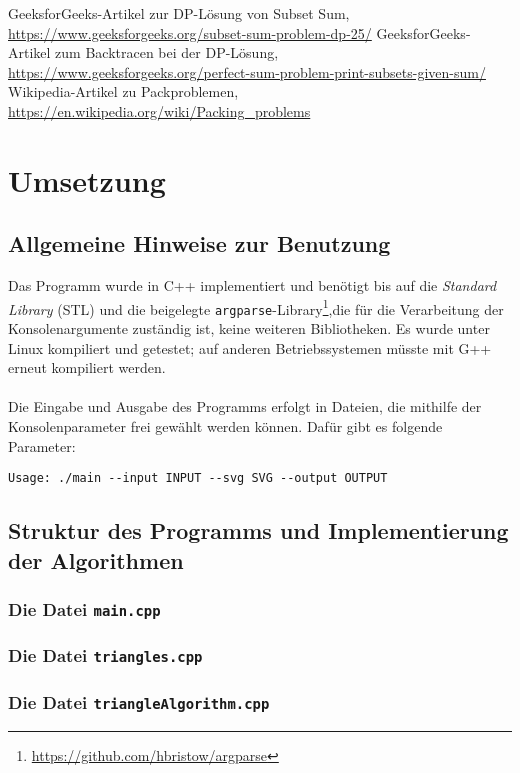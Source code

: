 \documentclass[a4paper, notitlepage, 12pt]{scrartcl}
\begin{document}
\begin{thebibliography}{xx}
	 GeeksforGeeks-Artikel zur DP-Lösung von Subset Sum, \url{https://www.geeksforgeeks.org/subset-sum-problem-dp-25/}
	 GeeksforGeeks-Artikel zum Backtracen bei der DP-Lösung, \url{https://www.geeksforgeeks.org/perfect-sum-problem-print-subsets-given-sum/}
	 Wikipedia-Artikel zu Packproblemen, \url{https://en.wikipedia.org/wiki/Packing_problems}
\end{thebibliography}
\section{Umsetzung}
\subsection{Allgemeine Hinweise zur Benutzung}
Das Programm wurde in C++ implementiert und benötigt bis auf die \textit{Standard Library} (STL) und die beigelegte \texttt{argparse}-Library\footnote{\url{https://github.com/hbristow/argparse}},die für die Verarbeitung der Konsolenargumente zuständig ist, keine weiteren Bibliotheken. Es wurde unter Linux kompiliert und getestet; auf anderen Betriebssystemen müsste mit G++ erneut kompiliert werden. \\ \\
Die Eingabe und Ausgabe des Programms erfolgt in Dateien, die mithilfe der Konsolenparameter frei gewählt werden können. Dafür gibt es folgende Parameter:
\begin{verbatim}
Usage: ./main --input INPUT --svg SVG --output OUTPUT
\end{verbatim}
\subsection{Struktur des Programms und Implementierung der Algorithmen}
\subsubsection{Die Datei \texttt{main.cpp}}
\subsubsection{Die Datei \texttt{triangles.cpp}}
\subsubsection{Die Datei \texttt{triangleAlgorithm.cpp}}
\end{document}
